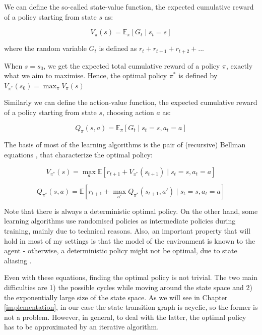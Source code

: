 We can define the so-called state-value function, the expected cumulative reward of a policy starting from state $s$ as:

\begin{equation}\label{eq:statevalueFunction}
V_{\pi}(s)=\mathbb{E}_\pi[G_t \mid s_t = s]
\end{equation}

where the random variable $G_t$ is defined as $r_{t} +  r_{t+1} + r_{t+2} + ...$

When $s=s_0$, we get the expected total cumulative reward of a policy $\pi$, exactly what we aim to maximise. Hence, the optimal policy $\pi^*$ is defined by $V_{\pi^*}(s_0)=\max_\pi V_{\pi}(s)$


Similarly we can define the action-value function, the expected cumulative reward of a policy starting from state $s$, choosing action $a$ as:

\begin{equation}\label{eq:actionvalueFunction}
Q_{\pi}(s, a)=\mathbb{E}_\pi[G_t \mid s_t = s, a_t = a]
\end{equation}


The basis of most of the learning algorithms is the pair of (recursive) Bellman equations \cite{bellman1957bellmanequation}, that characterize the optimal policy:


\begin{equation}\label{eq:bellmanState}
V_{\pi^*}(s) = \max_a \mathbb{E} [r_{t+1} + V_{\pi^*}(s_{t+1}) \mid s_t=s, a_t=a]
\end{equation}


\begin{equation} \label{eq:bellmanAction}
Q_{\pi^*}(s,a) = \mathbb{E} [r_{t+1} + \max_{a'} Q_{\pi^*}(s_{t+1},a') \mid s_t=s, a_t=a ] 
\end{equation}


Note that there is always a deterministic optimal policy. On the other hand, some learning algorithms use randomised policies as intermediate policies during training, mainly due to technical reasons. Also, an important property that will hold in most of my settings is that the model of the environment is known to the agent - otherwise, a deterministic policy might not be optimal, due to state aliasing .


Even with these equations, finding the optimal policy is not trivial. The two main difficulties are 1) the possible cycles while moving around the state space and 2) the exponentially large size of the state space. As we will see in Chapter \ref{implementation}, in our case the state transition graph is acyclic, so the former is not a problem. However, in general, to deal with the latter, the optimal policy has to be approximated by an iterative algorithm.



